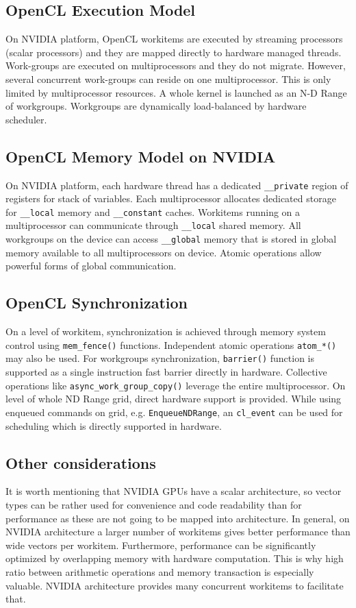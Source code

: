 \subsection{OpenCL Execution Model}
On NVIDIA platform, OpenCL workitems are executed by streaming processors (scalar processors) and they are mapped directly to hardware managed threads. Work-groups are executed on multiprocessors and they do not migrate. However, several concurrent work-groups can reside on one multiprocessor. This is only limited by multiprocessor resources. A whole kernel is launched as an N-D Range of workgroups. Workgroups are dynamically load-balanced by hardware scheduler.

\subsection{OpenCL Memory Model on NVIDIA}
On NVIDIA platform, each hardware thread has a dedicated \texttt{\_\_private} region of registers for stack of variables. Each multiprocessor allocates dedicated storage for \texttt{\_\_local} memory and \texttt{\_\_constant} caches. Workitems running on a multiprocessor can communicate through \texttt{\_\_local} shared memory. All workgroups on the device can access \texttt{\_\_global} memory that is stored in global memory available to all multiprocessors on device. Atomic operations allow powerful forms of global communication.

\subsection{OpenCL Synchronization}
On a level of workitem, synchronization is achieved through memory system control using \texttt{mem\_fence()} functions. Independent atomic operations \texttt{atom\_*()} may also be used. For workgroups synchronization, \texttt{barrier()} function is supported as a single instruction fast barrier directly in hardware. Collective operations like \texttt{async\_work\_group\_copy()} leverage the entire multiprocessor. On level of whole ND Range grid, direct hardware support is provided. While using enqueued commands on grid, e.g. \texttt{EnqueueNDRange}, an \texttt{cl\_event} can be used for scheduling which is directly supported in hardware.

\subsection{Other considerations}
It is worth mentioning that NVIDIA GPUs have a scalar architecture, so vector types can be rather used for convenience and code readability than for performance as these are not going to be mapped into architecture. In general, on NVIDIA architecture a larger number of workitems gives better performance than wide vectors per workitem. Furthermore, performance can be significantly optimized by overlapping memory with hardware computation. This is why high ratio between arithmetic operations and memory transaction is especially valuable. NVIDIA architecture provides many concurrent workitems to facilitate that.

